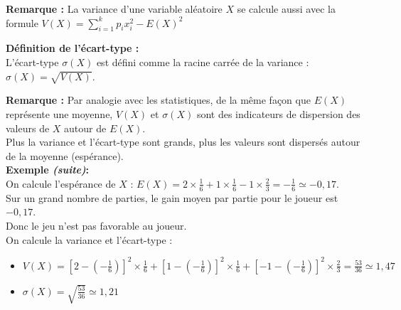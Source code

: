 \documentclass[11pt,a4paper]{article}
\begin{document}
\textbf{Remarque :} La variance d'une variable aléatoire $X$ se calcule aussi avec la formule $\displaystyle V(X)=\sum_{i=1}^{k} p_i x_i^2-E(X)^2$

\begin{mdframed}[style=definitionStyle]
    \textbf{Définition de l'écart-type :} ~\\
    L'écart-type $\sigma(X)$ est défini comme la racine carrée de la variance : $\sigma(X)=\sqrt{V(X)}$.
\end{mdframed}

\textbf{Remarque :} Par analogie avec les statistiques, de la même façon que $E(X)$ représente une moyenne, $V(X)$ et $\sigma(X)$ sont des indicateurs de dispersion des valeurs de $X$ autour de $E(X)$. \\
Plus la variance et l'écart-type sont grands, plus les valeurs sont dispersés autour de la moyenne (espérance). \\

\textbf{Exemple \emph{(suite)}:} ~\\
On calcule l'espérance de $X$ :
$\displaystyle E(X)=2\times\frac{1}{6}+1\times\frac{1}{6}-1\times\frac{2}{3}=-\frac{1}{6}\simeq-0,17$. \\
Sur un grand nombre de parties, le gain moyen par partie pour le joueur est $-0,17$. \\Donc le jeu n'est pas favorable au joueur. \\

On calcule la variance et l'écart-type :
\begin{itemize}
    \item $\displaystyle V(X)=\left[2-\left(-\frac{1}{6}\right)\right]^2\times \frac{1}{6}+\left[1-\left(-\frac{1}{6}\right)\right]^2\times \frac{1}{6}+\left[-1-\left(-\frac{1}{6}\right)\right]^2\times \frac{2}{3}=\frac{53}{36}\simeq1,47$
    \item $\displaystyle \sigma(X)=\sqrt{\frac{53}{36}}\simeq1,21$
\end{itemize}
\end{document}
